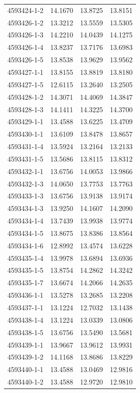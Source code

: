 \begin{longtable}{lrrr}
4593424-1-2 & 14.1670 & 13.8725 & 13.8151 \\
4593426-1-2 & 13.3212 & 13.5559 & 13.5305 \\
4593426-1-3 & 14.2210 & 14.0439 & 14.1275 \\
4593426-1-4 & 13.8237 & 13.7176 & 13.6983 \\
4593426-1-5 & 13.8538 & 13.9629 & 13.9562 \\
4593427-1-1 & 13.8155 & 13.8819 & 13.8180 \\
4593427-1-5 & 12.6115 & 13.2640 & 13.2505 \\
4593428-1-2 & 14.3071 & 14.4069 & 14.3847 \\
4593428-1-3 & 14.1411 & 14.3225 & 14.3700 \\
4593429-1-1 & 13.4588 & 13.6225 & 13.4709 \\
4593430-1-1 & 13.6109 & 13.8478 & 13.8657 \\
4593431-1-4 & 13.5924 & 13.2164 & 13.2133 \\
4593431-1-5 & 13.5686 & 13.8115 & 13.8312 \\
4593432-1-1 & 13.6756 & 14.0053 & 13.9866 \\
4593432-1-3 & 14.0650 & 13.7753 & 13.7763 \\
4593433-1-3 & 13.6756 & 13.9138 & 13.9174 \\
4593434-1-3 & 13.9250 & 14.1607 & 14.2090 \\
4593434-1-4 & 13.7439 & 13.9938 & 13.9774 \\
4593434-1-5 & 13.8675 & 13.8386 & 13.8564 \\
4593434-1-6 & 12.8992 & 13.4574 & 13.6228 \\
4593435-1-4 & 13.9978 & 13.6894 & 13.6936 \\
4593435-1-5 & 13.8754 & 14.2862 & 14.3242 \\
4593435-1-7 & 13.6674 & 14.2066 & 14.2635 \\
4593436-1-1 & 13.5278 & 13.2685 & 13.2208 \\
4593437-1-1 & 13.1224 & 12.7032 & 13.1438 \\
4593438-1-4 & 13.1224 & 13.0339 & 13.0806 \\
4593438-1-5 & 13.6756 & 13.5490 & 13.5681 \\
4593439-1-1 & 13.9667 & 13.9612 & 13.9931 \\
4593439-1-2 & 14.1168 & 13.8686 & 13.8229 \\
4593440-1-1 & 13.4588 & 13.0469 & 12.9816 \\
4593440-1-2 & 13.4588 & 12.9720 & 12.9810 \\

\end{longtable}

